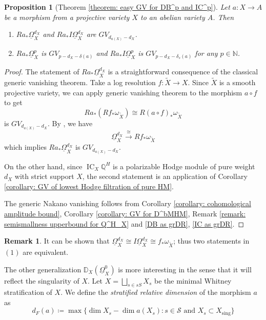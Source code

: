 \documentclass[11pt]{amsart}
\newtheorem{proposition}[equation]{Proposition}
\theoremstyle{definition}
\newtheorem{remark}[equation]{Remark}
\theoremstyle{plain}
\newcommand{\NN}{\mathbb N}
\newcommand{\QQ}{\mathbb Q}
\newcommand{\DD}{\mathbb D}
\newcommand{\sS}{\mathscr S}
\newcommand{\xto}{\xrightarrow} %
\newcommand{\DB}{\underline{\Omega}} %
\DeclareMathOperator{\sing}{sing}
\DeclareMathOperator{\IC}{IC}
\begin{document}
\begin{proposition}[Theorem \ref{theorem: easy GV for DB^p and IC^p}]
    Let $a:X\to A$ be a morphism from a projective variety $X$ to an abelian variety $A$. Then
    \begin{enumerate}
        \item $Ra_* \DB^{d_X}_X$ and $Ra_* I\DB_X^{d_X}$ are $GV_{d_{a(X)}-d_X}$. 
        \item $Ra_* \DB^{p}_X$ is $GV_{p-d_X -\delta(a)}$ and $Ra_* I\DB_X^{p}$ is $GV_{p-d_X -\delta_s(a)}$ for any $p\in \NN$.  
    \end{enumerate}
\end{proposition}

\begin{proof}
    The statement of $Ra_* \DB^{d_X}_X$ is a straightforward consequence of the classical generic vanishing theorem. Take a log resolution $f:\tilde X \to X$. Since $\tilde X$ is a smooth projective variety, we can apply generic vanishing theorem to the morphism $a \circ f$ to get
    \[Ra_* (Rf_* \omega_{\tilde X}) \cong R(a\circ f)_* \omega_{\tilde X}\]
    is $GV_{d_{a(X)}-d_X}$. By \cite[Proposition 3.3]{Steenbrink-vanishing}, we have 
    \[\DB^{d_X}_X \xto{\cong} Rf_* \omega_{\tilde X}\]
    which implies $Ra_* \DB^{d_X}_X$ is $GV_{d_{a(X)}-d_X}$.

    On the other hand, since $\IC_X\QQ^H$ is a polarizable Hodge module of pure weight $d_X$ with strict support $X$, the second statement is an application of Corollary \ref{corollary: GV of lowest Hodge filtration of pure HM}. 

    The generic Nakano vanishing follows from Corollary \ref{corollary: cohomological amplitude bound}, Corollary \ref{corollary: GV for D^bMHM}, Remark \ref{remark: semismallness upperbound for Q^H_X} and \ref{DB as grDR}, \ref{IC as grDR}.
\end{proof}

\begin{remark}
    It can be shown that $\DB_X^{d_X} \cong I\DB_X^{d_X} \cong f_* \omega_{\tilde X}$; thus two statements in $(1)$ are equivalent. 
\end{remark}

\medskip 

The other generalization $\DD_X(\DB^0_X)$ is more interesting in the sense that it will reflect the singularity of $X$. Let $X = \bigsqcup_{s\in sS} X_s$ be the minimal Whitney stratification of $X$. We define the \textit{stratified relative dimension} of the morphism $a$ as
\begin{equation} \label{definition: stratified relative dimension}
    d_F(a) \coloneqq \max\{\dim X_s - \dim a(X_s): s\in \sS \text{ and } X_s \subset X_{\sing}\}
\end{equation}
\end{document}
